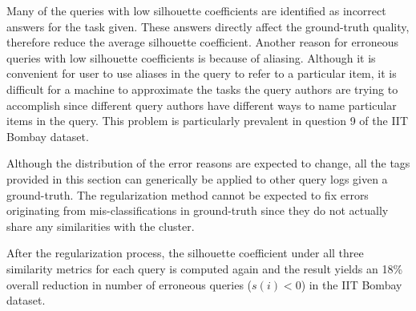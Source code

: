 Many of the queries with low silhouette coefficients are identified as incorrect answers for the task given. 
These answers directly affect the ground-truth quality, therefore reduce the average silhouette coefficient. 
Another reason for erroneous queries with low silhouette coefficients is because of aliasing. 
Although it is convenient for user to use aliases in the query to refer to a particular item, it is difficult for a machine to approximate the tasks the query authors are trying to accomplish since different query authors have different ways to name particular items in the query. 
This problem is particularly prevalent in question 9 of the IIT Bombay dataset.

Although the distribution of the error reasons are expected to change, all the tags provided in this section can generically be applied to other query logs given a ground-truth. 
The regularization method cannot be expected to fix errors originating from mis-classifications in ground-truth since they do not actually share any similarities with the cluster. 

After the regularization process, the silhouette coefficient under all three similarity metrics for each query is computed again and the result yields an 18\% overall reduction in number of erroneous queries ($s(i) < 0$)  in the IIT Bombay dataset. 

